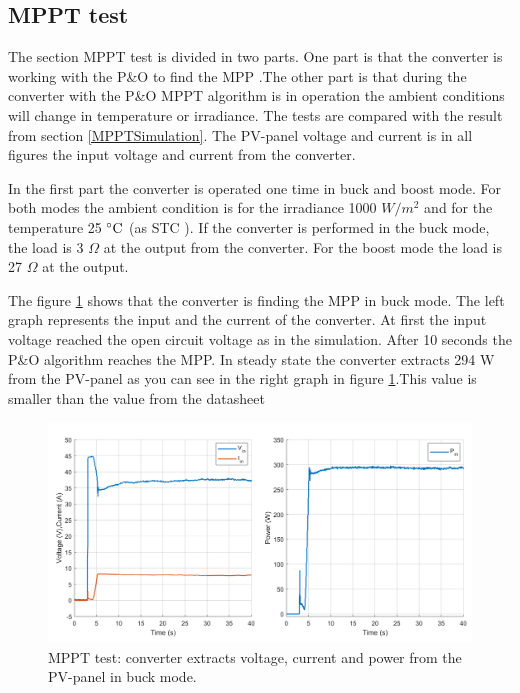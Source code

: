 \subsection{MPPT test}
The section MPPT test is divided in two parts. One part is that the converter is working with the P\&O to find the MPP .The other part is that during the converter with the P\&O MPPT algorithm is in operation the ambient conditions will change in temperature or irradiance. The tests are compared with the result from section \ref{MPPTSimulation}. The PV-panel voltage and current is in all figures the input voltage and current from the converter.

In the first part the converter is operated one time in buck and boost mode. For both modes the ambient condition is for the irradiance 1000 $W /m^2$ and for the temperature 25 $\decC$ (as STC ). If the converter is performed in the buck mode, the load is 3 $\Omega$ at the output from the converter. For the boost mode the load is 27 $\Omega$ at the output.

The figure \ref{MPPTtestbuckmode1} shows that the converter is finding the MPP in buck mode. The left graph represents the input and the current of the converter. At first the input voltage reached the open circuit voltage as in the simulation.  After 10 seconds the P\&O algorithm reaches the MPP. In steady state the converter extracts 294 W from the PV-panel as you can see in the right graph in figure \ref{MPPTtestbuckmode1}.This value is smaller than the value from the datasheet \cite{PV_panel}

\begin{figure}[H]
	\begin{center}
		\includegraphics[width=1\textwidth]{../Pictures/P1/Test/Buck_mode_MPPT_Vin_Iin_Pin}
		\caption{MPPT test: converter extracts voltage, current and power from the PV-panel in buck mode.}
		\label{MPPTtestbuckmode1}
	\end{center}	
\end{figure}

